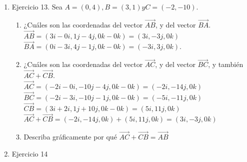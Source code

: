 \documentclass[10pt,letterpaper,fleqn]{article}
\begin{document}
\begin{enumerate}
\begin{enumerate}
          \end{enumerate}

        \item Ejercicio 13. Sea $A = (0, 4), B = (3, 1) y C = (−2, −10)$.
        \begin{enumerate}
          \item ¿Cuáles son las coordenadas del vector $\overrightarrow{AB}$, y
          del vector $\overrightarrow{BA}$. \\
          $\overrightarrow{AB} = (3i-0i,1j-4j,0k-0k) = (3i,-3j,0k)$ \\
          $\overrightarrow{BA} = (0i-3i,4j-1j,0k-0k) = (-3i,3j,0k)$.

          \item ¿Cuáles son las coordenadas del vector $\overrightarrow{AC}$, y
          del vector $\overrightarrow{BC}$, y también $\overrightarrow{AC} +
          \overrightarrow{CB}$. \\
          $\overrightarrow{AC} = (-2i-0i,-10j-4j,0k-0k) = (-2i,-14j,0k)$ \\
          $\overrightarrow{BC} = (-2i-3i,-10j-1j,0k-0k) = (-5i,-11j,0k)$ \\
          $\overrightarrow{CB} = (3i+2i,1j+10j,0k-0k) = (5i,11j,0k)$ \\
          $\overrightarrow{AC} + \overrightarrow{CB} = (-2i,-14j,0k) +
          (5i,11j,0k) = (3i,-3j,0k)$

          \item Describa gráficamente por qué $\overrightarrow{AC} +
          \overrightarrow{CB} = \overrightarrow{AB}$

        \end{enumerate}

        \item Ejercicio 14

    \end{enumerate}
\end{document}

